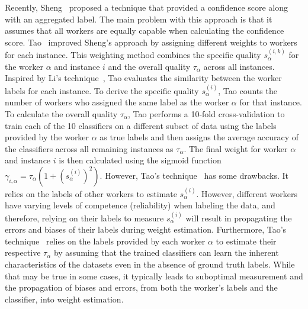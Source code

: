 Recently, Sheng~\cite{sheng_Majority_2019} proposed a technique that provided a confidence score along with an aggregated label. The main problem with this approach is that it assumes that all workers are equally capable when calculating the confidence score. Tao~\cite{tao_Label_2020} improved Sheng's approach by assigning different weights to workers for each instance. This weighting method combines the specific quality $s_\alpha^{(i,k)} $ for the worker $\alpha $ and instance $i $ and the overall quality $\tau_\alpha$ across all instances. Inspired by Li's technique~\cite{li_Incorporating_2018}, Tao evaluates the similarity between the worker labels for each instance. To derive the specific quality $s_{\alpha}^{(i)}$, Tao counts the number of workers who assigned the same label as the worker $\alpha $ for that instance. To calculate the overall quality $\tau_\alpha $, Tao performs a 10-fold cross-validation to train each of the 10 classifiers on a different subset of data using the labels provided by the worker $\alpha $ as true labels and then assigns the average accuracy of the classifiers across all remaining instances as $\tau_\alpha $. The final weight for worker $\alpha $ and instance $i $ is then calculated using the sigmoid function $\gamma_{i,\alpha}=\tau_\alpha\left(1+{\left(s_{\alpha}^{(i)}\right)}^{2}\right) $. However, Tao's technique~\cite{tao_Label_2020} has some drawbacks. It relies on the labels of other workers to estimate $s_{\alpha}^{(i)} $. However, different workers have varying levels of competence (reliability) when labeling the data, and therefore, relying on their labels to measure $s_{\alpha}^{(i)} $ will result in propagating the errors and biases of their labels during weight estimation. Furthermore, Tao's technique~\cite{tao_Label_2020} relies on the labels provided by each worker $\alpha $ to estimate their respective $\tau_\alpha $ by assuming that the trained classifiers can learn the inherent characteristics of the datasets even in the absence of ground truth labels. While that may be true in some cases, it typically leads to suboptimal measurement and the propagation of biases and errors, from both the worker's labels and the classifier, into weight estimation.
%
